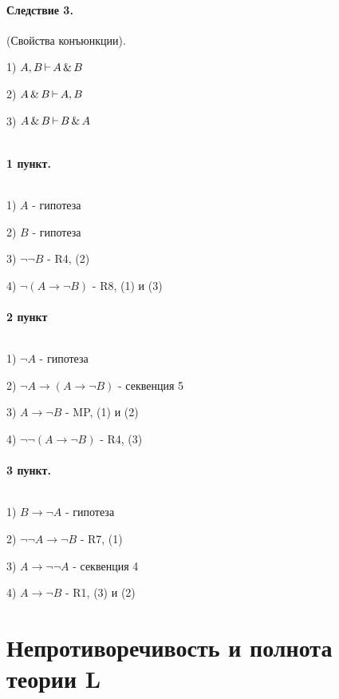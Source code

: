

\title{}
\author{Козырнов Александр Дмитриевич, ИУ7-32Б}
\date{\today}



\paragraph*{Следствие 3.}
(Свойства конъюнкции). 

1) $A,B \operatorname{\vdash} A\operatorname{\&} B$

2)  $A\operatorname{\&} B \operatorname{\vdash} A,B$

3)  $A\operatorname{\&} B \operatorname{\vdash} B\operatorname{\&} A$

\begin{myproof}
    ${}$

\paragraph*{1 пункт.} ${}$ \newline

1) $A$ - гипотеза

2) $B$ - гипотеза

3) $\lnot\lnot B$ - R4, (2)

4)  $\lnot(A \to \lnot B)$ - R8, (1) и (3)

\paragraph*{2 пункт} ${}$ \newline

1) $\lnot A$ - гипотеза

2)  $\lnot A \to (A \to \lnot B)$ - секвенция 5

3) $A \to \lnot B$ - MP, (1) и (2)

4) $\lnot\lnot(A \to \lnot B)$ - R4, (3)

\paragraph*{3 пункт.} ${}$ \newline

1) $B \to \lnot A$ - гипотеза

2) $\lnot\lnot A \to \lnot B$ - R7, (1)

3) $A \to \lnot\lnot A$ - секвенция 4

4) $A \to \lnot B$ - R1, (3) и (2)

\end{myproof}

\section{Непротиворечивость и полнота теории L}

